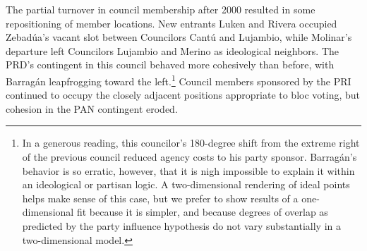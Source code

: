 \documentclass[12 pt, letter]{article}
\begin{document}
The partial turnover in council membership after 2000 resulted in some repositioning of member locations.  New entrants Luken and Rivera occupied Zebad\'ua's vacant slot between Councilors Cant\'u and Lujambio, while Molinar's departure left Councilors Lujambio and Merino as ideological neighbors.  The PRD's contingent in this council behaved more cohesively than before, with Barrag\'an leapfrogging toward the left.\footnote{In a generous reading, this councilor's 180-degree shift from the extreme right of the previous council reduced agency costs to his party sponsor.  Barrag\'an's behavior is so erratic, however, that it is nigh impossible to explain it within an ideological or partisan logic.  A two-dimensional rendering of ideal points helps make sense of this case, but we prefer to show results of a one-dimensional fit because it is simpler, and because degrees of overlap as predicted by the party influence hypothesis do not vary substantially in a two-dimensional model.} %
Council members sponsored by the PRI continued to occupy the closely adjacent positions appropriate to bloc voting, but cohesion in the PAN contingent eroded.

\end{document}
